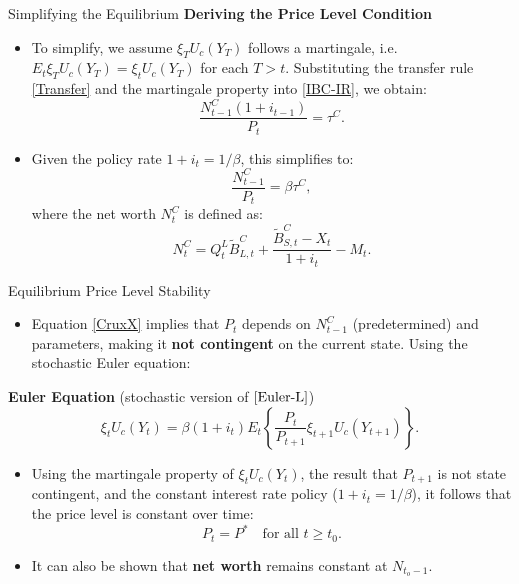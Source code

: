 \documentclass[11pt,aspectratio=169]{beamer}
\begin{document}
\begin{frame}{Simplifying the Equilibrium}
\small
\textbf{Deriving the Price Level Condition}
\begin{itemize}
    \item To simplify, we assume $\xi _{T}U_{c}(Y_{T})$ follows a martingale, i.e. $E_{t}\xi _{T}U_{c}(Y_{T})=\xi _{t}U_{c}(Y_{T})$ for each $T>t$. Substituting the transfer rule \eqref{Transfer} and the martingale property into \eqref{IBC-IR}, we obtain:
    \begin{equation*}
        \frac{N_{t-1}^{C}(1+i_{t-1})}{P_{t}}=\tau ^{C}.
    \end{equation*}
    \item Given the policy rate $1+i_{t}=1/\beta$, this simplifies to:
    \begin{equation}
        \frac{N_{t-1}^{C}}{P_{t}}=\beta \tau ^{C}, \label{CruxX}
    \end{equation}
where the net worth $N_{t}^{C}$ is defined as:
\begin{equation}
    N_{t}^{C}=Q_{t}^{L}\tilde{B}_{L,t}^{C}+\frac{\tilde{B}_{S,t}^{C}-X_{t}}{1+i_{t}}-M_{t}. \label{DefNW}
\end{equation}
\end{itemize}
\end{frame}
\begin{frame}[label=Equilibrium]{Equilibrium Price Level Stability}
\small

\begin{itemize}
    \item Equation \eqref{CruxX} implies that $P_t$ depends on $N_{t-1}^C$ (predetermined) and parameters, making it \textbf{not contingent} on the current state. Using the stochastic Euler equation:
\end{itemize}

\vspace{0.2cm}

\textbf{Euler Equation} (stochastic version of $\ref{Euler-L}$)
\begin{equation*}
    \xi _{t}U_{c}(Y_{t})=\beta (1+i_{t})E_{t}\left\{ \frac{P_{t}}{P_{t+1}}\xi_{t+1}U_{c}(Y_{t+1})\right\}.
\end{equation*}

\vspace{0.2cm}

\begin{itemize}
    \item Using the martingale property of $\xi _{t}U_{c}(Y_{t})$, the result that $P_{t+1}$ is not state contingent, and the constant interest rate policy ($1+i_t = 1/\beta$), it follows that the price level is constant over time:
    \begin{equation*}
        P_t = P^* \quad \text{for all } t \ge t_0.
    \end{equation*}
    \item It can also be shown that \textbf{net worth} remains constant at $N_{t_o-1}$.
\end{itemize}
\centering  \hyperlink{Net}{}
\end{frame}
\end{document}

